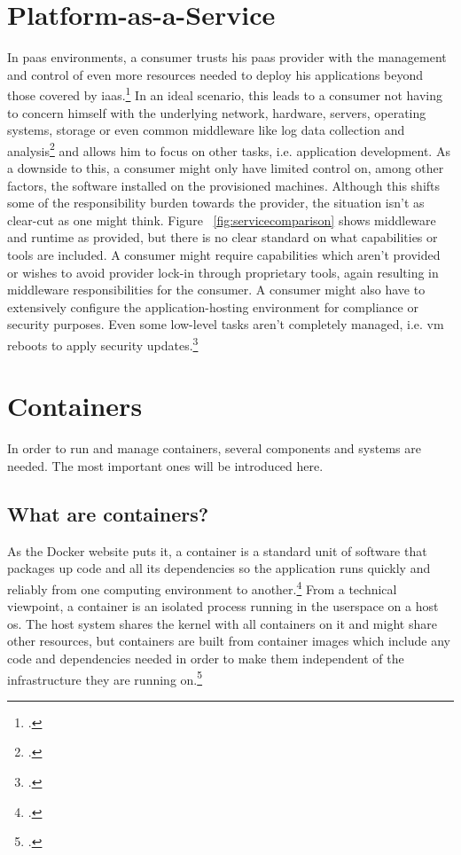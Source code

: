 \section{Platform-as-a-Service}

In \gls{paas} environments, a consumer trusts his \gls{paas} provider with the management and control of even more resources needed to deploy his applications beyond those covered by \gls{iaas}.\footcite{nistcloud}
In an ideal scenario, this leads to a consumer not having to concern himself with the underlying network, hardware, servers, operating systems, storage or even common middleware like log data collection and analysis\footcite{msPaas} and allows him to focus on other tasks, i.e. application development.
As a downside to this, a consumer might only have limited control on, among other factors, the software installed on the provisioned machines. 
Although this shifts some of the responsibility burden towards the provider, the situation isn't as clear-cut as one might think. 
Figure ~\ref{fig:servicecomparison} shows middleware and runtime as provided, but there is no clear standard on what capabilities or tools are included.
A consumer might require capabilities which aren't provided or wishes to avoid provider lock-in through proprietary tools, 
again resulting in middleware responsibilities for the consumer. 
A consumer might also have to extensively configure the application-hosting environment for compliance or security purposes. 
Even some low-level tasks aren't completely managed, i.e. \gls{vm} reboots to apply security updates.\footcite{msVmReboot}

\section{Containers}

In order to run and manage containers, several components and systems are needed. The most important ones will be introduced here.

\subsection{What are containers?}
As the Docker website puts it, a container is a standard unit of software that packages up code and all its dependencies so the application runs quickly and reliably from one computing environment to another.\footcite{whatContainer}
From a technical viewpoint, a container is an isolated process running in the userspace on a host \gls{os}. The host system shares the kernel with all containers on it and might share other resources, but containers are built from container images which include any code and dependencies needed in order to make them independent of the infrastructure they are running on.\footcite{containerIntro}

